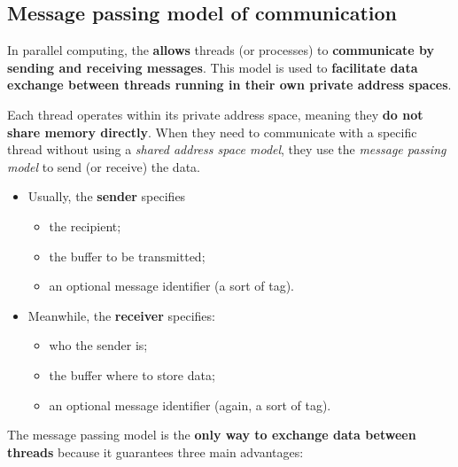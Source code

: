 \subsection{Message passing model of communication}

In parallel computing, the  \textbf{allows} threads (or processes) to \textbf{communicate by sending and receiving messages}. This model is used to \textbf{facilitate data exchange between threads running in their own private address spaces}.

\highspace
Each thread operates within its private address space, meaning they \textbf{do not share memory directly}. When they need to communicate with a specific thread without using a \emph{shared address space model}, they use the \emph{message passing model} to send (or receive) the data.
\begin{itemize}
    \item Usually, the \textbf{sender} specifies
    \begin{itemize}
        \item the recipient;
        \item the buffer to be transmitted;
        \item an optional message identifier (a sort of tag).
    \end{itemize}
    \item Meanwhile, the \textbf{receiver} specifies:
    \begin{itemize}
        \item who the sender is;
        \item the buffer where to store data;
        \item an optional message identifier (again, a sort of tag).
    \end{itemize}
\end{itemize}
The message passing model is the \textbf{only way to exchange data between threads} because it guarantees three main advantages:
